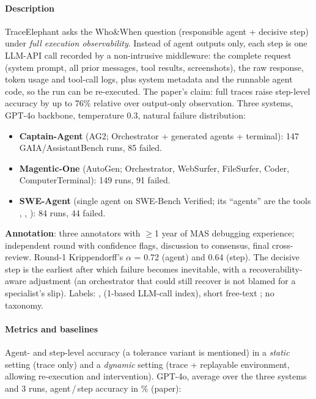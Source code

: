 \paragraph{Description} TraceElephant asks the Who\&When question (responsible agent + decisive step) under \emph{full execution observability}. Instead of agent outputs only, each step is one LLM-API call recorded by a non-intrusive middleware: the complete request (system prompt, all prior messages, tool results, screenshots), the raw response, token usage and tool-call logs, plus system metadata and the runnable agent code, so the run can be re-executed. The paper's claim: full traces raise step-level accuracy by up to 76\% relative over output-only observation. Three systems, GPT-4o backbone, temperature 0.3, natural failure distribution:
\begin{itemize}
\item \textbf{Captain-Agent} (AG2; Orchestrator + generated  agents + terminal): 147 GAIA/AssistantBench runs, 85 failed.
\item \textbf{Magentic-One} (AutoGen; Orchestrator, WebSurfer, FileSurfer, Coder, ComputerTerminal): 149 runs, 91 failed.
\item \textbf{SWE-Agent} (single agent on SWE-Bench Verified; its ``agents'' are the tools , , ): 84 runs, 44 failed.
\end{itemize}
\textbf{Annotation}: three annotators with $\ge$1 year of MAS debugging experience; independent round with confidence flags, discussion to consensus, final cross-review. Round-1 Krippendorff's $\alpha$ = 0.72 (agent) and 0.64 (step). The decisive step is the earliest after which failure becomes inevitable, with a recoverability-aware adjustment (an orchestrator that could still recover is not blamed for a specialist's slip). Labels: ,  (1-based LLM-call index), short free-text ; no taxonomy.

\paragraph{Metrics and baselines} Agent- and step-level accuracy (a tolerance variant is mentioned) in a \emph{static} setting (trace only) and a \emph{dynamic} setting (trace + replayable environment, allowing re-execution and intervention). GPT-4o, average over the three systems and 3 runs, agent\,/\,step accuracy in \% (paper):

